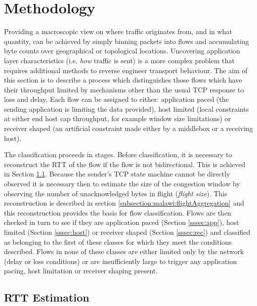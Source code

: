 \section{Methodology}

Providing a macroscopic view on where traffic originates from, and in what quantity, can be achieved by simply binning packets into flows and accumulating byte counts over geographical or topological locations. 
Uncovering application layer characteristics (i.e. \textit{how} traffic is sent) is a more complex problem that requires additional methods to reverse engineer transport behaviour.  The aim of this section is to describe a process which distinguishes those flows which have their throughput limited by mechanisms other than the usual TCP response to loss and delay.  Each flow can be assigned to either: application paced (the sending application is limiting the data provided), host limited (local constraints at either end host cap throughput, for example window size limitations) or receiver shaped (an artificial constraint made either by a middlebox or a receiving host). 

The classification proceeds in stages.  Before classification, it is necessary to reconstruct the RTT of the flow if the flow is not bidirectional.  This is achieved in Section \ref{subsection:malawi:PeriodicEnhancement}.  Because the sender's TCP state machine cannot be directly observed it is necessary then to estimate the size of the congestion window by observing the number of unacknowledged bytes in flight (\textit{flight size}).  This reconstruction is described in section \ref{subsection:malawi:flightAggregation} and this reconstruction provides the basis for flow classification.  Flows are then checked in turn to see if they are application paced (Section \ref{sssec:app}), host limited (Section \ref{sssec:host}) or receiver shaped (Section \ref{sssec:rec}) and classified as belonging to the first of these classes for which they meet the conditions described.   Flows in none of these classes are either limited only by the network (delay or loss conditions) or are insufficiently large to trigger any application 
pacing, 
host limitation or receiver shaping present.

\subsection{RTT Estimation}
\label{subsection:malawi:PeriodicEnhancement}


